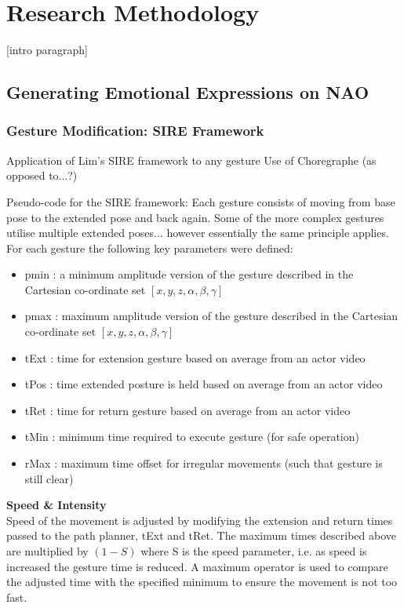 \documentclass[11pt,a4paper]{report}
\begin{document}
\chapter{Research Methodology}
[intro paragraph]
\section{Generating Emotional Expressions on NAO}
\subsection{Gesture Modification: SIRE Framework}
Application of Lim's SIRE framework to any gesture
Use of Choregraphe (as opposed to...?)

Pseudo-code for the SIRE framework:
Each gesture consists of moving from base pose to the extended pose and back again. Some of the more complex gestures utilise multiple extended poses... however essentially the same principle applies. For each gesture the following key parameters were defined:
\begin{itemize}
\item pmin : a minimum amplitude version of the gesture described in the Cartesian co-ordinate set $[x,y,z,\alpha,\beta,\gamma]$
\item pmax : maximum amplitude version of the gesture described in the Cartesian co-ordinate set $[x,y,z,\alpha,\beta,\gamma]$
\item tExt : time for extension gesture based on average from an actor video
\item tPos : time extended posture is held based on average from an actor video
\item tRet : time for return gesture based on average from an actor video
\item tMin : minimum time required to execute gesture (for safe operation)
\item rMax : maximum time offset for irregular movements (such that gesture is still clear)
\end{itemize}

\textbf{Speed \& Intensity}
\\Speed of the movement is adjusted by modifying the extension and return times passed to the path planner, tExt and tRet. The maximum times described above are multiplied by $(1-S)$ where S is the speed parameter, i.e. as speed is increased the gesture time is reduced. A maximum operator is used to compare the adjusted time with the specified minimum to ensure the movement is not too fast.
\end{document}
